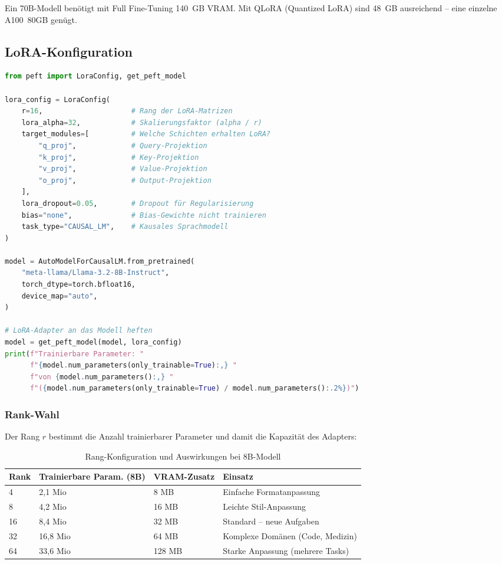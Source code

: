 Ein 70B-Modell benötigt mit Full Fine-Tuning 140~GB VRAM. Mit QLoRA (Quantized LoRA) sind 48~GB ausreichend -- eine einzelne A100~80GB genügt.

\subsection{LoRA-Konfiguration}

\begin{lstlisting}[language=Python, caption=LoRA-Konfiguration mit Hugging Face PEFT]
from peft import LoraConfig, get_peft_model

lora_config = LoraConfig(
    r=16,                     # Rang der LoRA-Matrizen
    lora_alpha=32,            # Skalierungsfaktor (alpha / r)
    target_modules=[          # Welche Schichten erhalten LoRA?
        "q_proj",             # Query-Projektion
        "k_proj",             # Key-Projektion
        "v_proj",             # Value-Projektion
        "o_proj",             # Output-Projektion
    ],
    lora_dropout=0.05,        # Dropout für Regularisierung
    bias="none",              # Bias-Gewichte nicht trainieren
    task_type="CAUSAL_LM",    # Kausales Sprachmodell
)

model = AutoModelForCausalLM.from_pretrained(
    "meta-llama/Llama-3.2-8B-Instruct",
    torch_dtype=torch.bfloat16,
    device_map="auto",
)

# LoRA-Adapter an das Modell heften
model = get_peft_model(model, lora_config)
print(f"Trainierbare Parameter: "
      f"{model.num_parameters(only_trainable=True):,} "
      f"von {model.num_parameters():,} "
      f"({model.num_parameters(only_trainable=True) / model.num_parameters():.2%})")
\end{lstlisting}

\subsubsection{Rank-Wahl}

Der Rang $r$ bestimmt die Anzahl trainierbarer Parameter und damit die Kapazität des Adapters:

\begin{table}[H]
\centering
\begin{tabularx}{\linewidth}{lXXX}
\toprule
\textbf{Rank} & \textbf{Trainierbare Param. (8B)} & \textbf{VRAM-Zusatz} & \textbf{Einsatz} \\
\midrule
4 & 2,1 Mio & 8 MB & Einfache Formatanpassung \\
8 & 4,2 Mio & 16 MB & Leichte Stil-Anpassung \\
16 & 8,4 Mio & 32 MB & Standard -- neue Aufgaben \\
32 & 16,8 Mio & 64 MB & Komplexe Domänen (Code, Medizin) \\
64 & 33,6 Mio & 128 MB & Starke Anpassung (mehrere Tasks) \\
\bottomrule
\end{tabularx}
\caption{Rang-Konfiguration und Auswirkungen bei 8B-Modell}
\label{tab:lora-rank}
\end{table}


